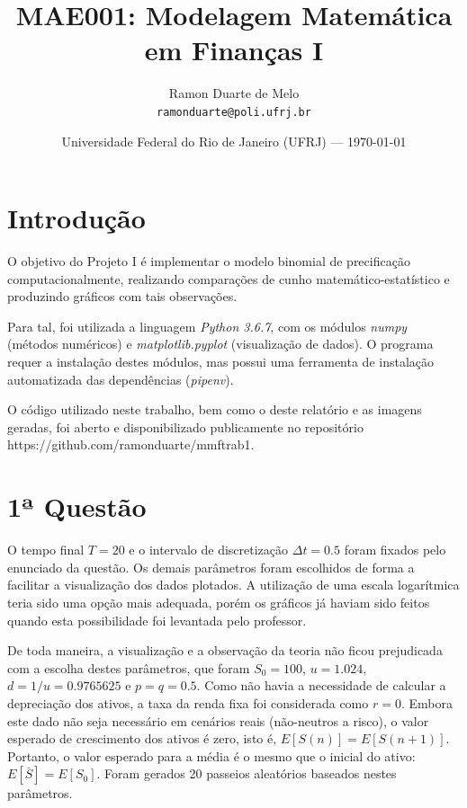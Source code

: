 \documentclass{article}
\title{MAE001: Modelagem Matemática em Finanças I} %
\author{Ramon Duarte de Melo\\ \texttt{ramonduarte@poli.ufrj.br}} %
\date{Universidade Federal do Rio de Janeiro (UFRJ) --- \today} %
\begin{document}
\maketitle %


\section*{Introdução} %

O objetivo do Projeto I é implementar o modelo binomial de precificação computacionalmente, realizando comparações de cunho matemático-estatístico e produzindo gráficos com tais observações. 

Para tal, foi utilizada a linguagem \emph{Python 3.6.7}, com os módulos \emph{numpy} (métodos numéricos) e \emph{matplotlib.pyplot} (visualização de dados).
O programa requer a instalação destes módulos, mas possui uma ferramenta de instalação automatizada das dependências (\emph{pipenv}). 

O código utilizado neste trabalho, bem como o deste relatório e as imagens geradas, foi aberto e disponibilizado publicamente no repositório https://github.com/ramonduarte/mmftrab1.



\section*{1ª Questão} %

O tempo final $T = 20$ e o intervalo de discretização $\Delta t = 0.5$ foram fixados pelo enunciado da questão.
Os demais parâmetros foram escolhidos de forma a facilitar a visualização dos dados plotados.
A utilização de uma escala logarítmica teria sido uma opção mais adequada, porém os gráficos já haviam sido feitos quando esta possibilidade foi levantada pelo professor.

De toda maneira, a visualização e a observação da teoria não ficou prejudicada com a escolha destes parâmetros, que foram $S_{0} = 100$, $u = 1.024$, $d = 1/u = 0.9765625$ e $p = q = 0.5$. 
Como não havia a necessidade de calcular a depreciação dos ativos, a taxa da renda fixa foi considerada como $r = 0$.
Embora este dado não seja necessário em cenários reais (não-neutros a risco), o valor esperado de crescimento dos ativos é zero, isto é, $E[S(n)] = E[S(n+1)]$.
Portanto, o valor esperado para a média é o mesmo que o inicial do ativo: $E[\bar{S}] = E[S_{0}]$.
Foram gerados 20 passeios aleatórios baseados nestes parâmetros.
\end{document}
